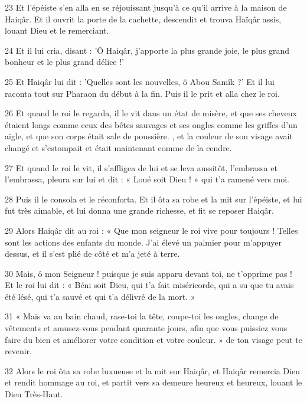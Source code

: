 \par 23 Et l'épéiste s'en alla en se réjouissant jusqu'à ce qu'il arrive à la maison de Haiqâr. Et il ouvrit la porte de la cachette, descendit et trouva Haïqâr assis, louant Dieu et le remerciant.

\par 24 Et il lui cria, disant : 'Ô Haiqâr, j'apporte la plus grande joie, le plus grand bonheur et le plus grand délice !'

\par 25 Et Haiqâr lui dit : 'Quelles sont les nouvelles, ô Abou Samîk ?' Et il lui raconta tout sur Pharaon du début à la fin. Puis il le prit et alla chez le roi.

\par 26 Et quand le roi le regarda, il le vit dans un état de misère, et que ses cheveux étaient longs comme ceux des bêtes sauvages et ses ongles comme les griffes d'un aigle, et que son corps était sale de poussière. , et la couleur de son visage avait changé et s'estompait et était maintenant comme de la cendre.

\par 27 Et quand le roi le vit, il s'affligea de lui et se leva aussitôt, l'embrassa et l'embrassa, pleura sur lui et dit : « Loué soit Dieu ! » qui t'a ramené vers moi.

\par 28 Puis il le consola et le réconforta. Et il ôta sa robe et la mit sur l'épéiste, et lui fut très aimable, et lui donna une grande richesse, et fit se reposer Haiqâr.

\par 29 Alors Haiqâr dit au roi : « Que mon seigneur le roi vive pour toujours ! Telles sont les actions des enfants du monde. J'ai élevé un palmier pour m'appuyer dessus, et il s'est plié de côté et m'a jeté à terre.

\par 30 Mais, ô mon Seigneur ! puisque je suis apparu devant toi, ne t'opprime pas ! Et le roi lui dit : « Béni soit Dieu, qui t'a fait miséricorde, qui a su que tu avais été lésé, qui t'a sauvé et qui t'a délivré de la mort. »

\par 31 « Mais va au bain chaud, rase-toi la tête, coupe-toi les ongles, change de vêtements et amusez-vous pendant quarante jours, afin que vous puissiez vous faire du bien et améliorer votre condition et votre couleur. » de ton visage peut te revenir.

\par 32 Alors le roi ôta sa robe luxueuse et la mit sur Haiqâr, et Haiqâr remercia Dieu et rendit hommage au roi, et partit vers sa demeure heureux et heureux, louant le Dieu Très-Haut.

